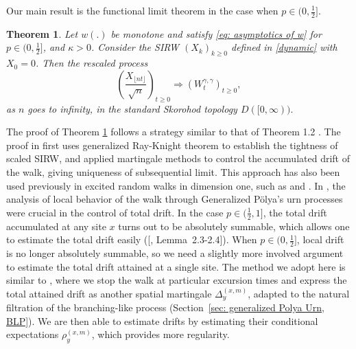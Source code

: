 \documentclass[twoside,12pt,a4paper]{article}
\newtheorem{theorem}{Theorem}[section]
\numberwithin{equation}{section}
\begin{document}
	\begin{samepage}
	Our main result is the functional limit theorem in the case when $p\in (0,\frac{1}{2}]$.
	\begin{theorem}\label{thm: main}
		Let $w(.)$ be monotone and satisfy \eqref{eq: asymptotics of w} for $p\in (0,\frac{1}{2}]$, and $\kappa >0 $. Consider the SIRW $(X_k)_{k\geq 0}$ defined in \eqref{dynamic} with $X_0 =0$. Then the rescaled process
		\[
		\left(  \frac{X_{\lfloor nt \rfloor }}{\sqrt{n}}  \right)_{t\geq 0} \Longrightarrow \left( W^{\gamma,\gamma}_{t}\right)_{t\geq 0},
		\]
		as $n$ goes to infinity, in the standard Skorohod topology $D([0,\infty) ).$
	\end{theorem}
	\end{samepage}
	The proof of Theorem \ref{thm: main} follows a strategy similar to that of Theorem 1.2 \cite{KMP22}. The proof in \cite{KMP22} first uses generalized Ray-Knight theorem to establish the tightness of scaled SIRW, and applied martingale methods to control the accumulated drift of the walk, giving uniqueness of subsequential limit. 
	This approach
	has also been used previously in excited random walks in dimension one, such as \cite{DK12} and \cite{KP16}. %
	In \cite{KMP22}, the analysis of local behavior of the walk through Generalized P\"olya's urn processes were crucial in the control of total drift. 
	In the case $p \in (\frac{1}{2}, 1]$, the total drift accumulated at any site $x$ turns out to be absolutely summable, which allows one to estimate the total drift easily ([\cite{KMP22}, Lemma~2.3-2.4]).
	When $p \in (0,\frac{1}{2}]$, local drift is no longer absolutely summable, so we need a slightly more involved argument to estimate the total drift attained at a single site. The method we adopt here is similar to \cite{KP16}, where we stop the walk at particular excursion times and express the total attained drift as another spatial martingale $\Delta_y^{(x,m)}$, adapted to the natural filtration of the branching-like process (Section~\ref{sec: generalized Polya Urn, BLP}). We are then able to estimate drifts by estimating their conditional expectations $\rho_y^{(x,m)}$, which provides more regularity.
\end{document}
